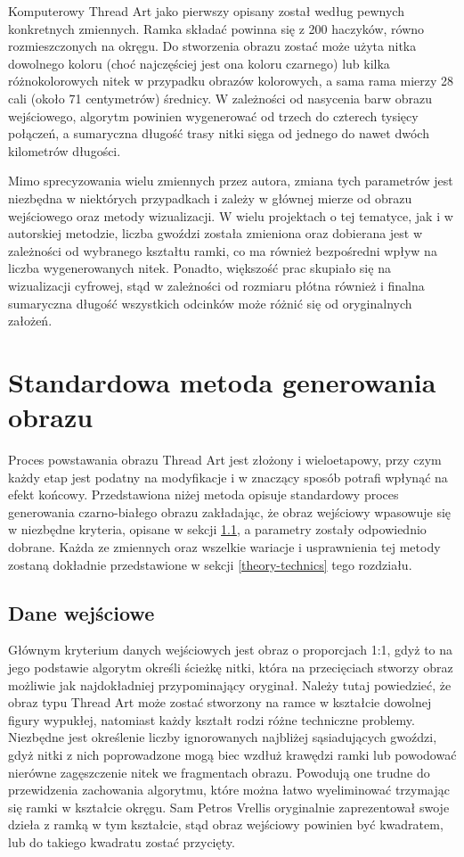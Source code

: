     Komputerowy Thread Art jako pierwszy opisany został według pewnych konkretnych zmiennych. Ramka składać powinna się z 200 haczyków, równo rozmieszczonych na okręgu. Do stworzenia obrazu zostać może użyta nitka dowolnego koloru (choć najczęściej jest ona koloru czarnego) lub kilka różnokolorowych nitek w przypadku obrazów kolorowych, a sama rama mierzy 28 cali (około 71 centymetrów) średnicy. W zależności od nasycenia barw obrazu wejściowego, algorytm powinien wygenerować od trzech do czterech tysięcy połączeń, a sumaryczna długość trasy nitki sięga od jednego do nawet dwóch kilometrów długości.
    
    Mimo sprecyzowania wielu zmiennych przez autora, zmiana tych parametrów jest niezbędna w niektórych przypadkach i zależy w głównej mierze od obrazu wejściowego oraz metody wizualizacji. W wielu projektach o tej tematyce, jak i w autorskiej metodzie, liczba gwoździ została zmieniona oraz dobierana jest w zależności od wybranego kształtu ramki, co ma również bezpośredni wpływ na liczba wygenerowanych nitek. Ponadto, większość prac skupiało się na wizualizacji cyfrowej, stąd w zależności od rozmiaru płótna również i finalna sumaryczna długość wszystkich odcinków może różnić się od oryginalnych założeń.
    
    \section{Standardowa metoda generowania obrazu} \label{theory-std-method}
    Proces powstawania obrazu Thread Art jest złożony i wieloetapowy, przy czym każdy etap jest podatny na modyfikacje i w znaczący sposób potrafi wpłynąć na efekt końcowy. Przedstawiona niżej metoda opisuje standardowy proces generowania czarno-białego obrazu zakładając, że obraz wejściowy wpasowuje się w niezbędne kryteria, opisane w sekcji \ref{theory-std-method-input}, a parametry zostały odpowiednio dobrane. Każda ze zmiennych oraz wszelkie wariacje i usprawnienia tej metody zostaną dokładnie przedstawione w sekcji \ref{theory-technics} tego rozdziału.
        \subsection{Dane wejściowe} \label{theory-std-method-input}
        Głównym kryterium danych wejściowych jest obraz o proporcjach 1:1, gdyż to na jego podstawie algorytm określi ścieżkę nitki, która na przecięciach stworzy obraz możliwie jak najdokładniej przypominający oryginał. Należy tutaj powiedzieć, że obraz typu Thread Art może zostać stworzony na ramce w kształcie dowolnej figury wypukłej, natomiast każdy kształt rodzi różne techniczne problemy. Niezbędne jest określenie liczby ignorowanych najbliżej sąsiadujących gwoździ, gdyż nitki z nich poprowadzone mogą biec wzdłuż krawędzi ramki lub powodować nierówne zagęszczenie nitek we fragmentach obrazu. Powodują one trudne do przewidzenia zachowania algorytmu, które można łatwo wyeliminować trzymając się ramki w kształcie okręgu. Sam Petros Vrellis oryginalnie zaprezentował swoje dzieła z ramką w tym kształcie, stąd obraz wejściowy powinien być kwadratem, lub do takiego kwadratu zostać przycięty. 
        

